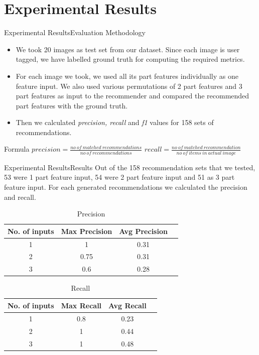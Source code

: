 \documentclass[10pt]{beamer}
\begin{document}
\section{Experimental Results}
\begin{frame}{Experimental Results}{Evaluation Methodology}
\begin{itemize}
\item We took 20 images as test set from our dataset. Since each image is user tagged, we have labelled ground truth for computing the required metrics.
\pause
\item For each image we took, we used all its part features individually as one feature input. We also used various permutations of 2 part features and 3 part features as input to the recommender and compared the recommended part features with the ground truth.
\pause
\item Then we calculated \textit{precision, recall} and \textit{f1} values for 158 sets of recommendations.
\end{itemize}
\pause
\begin{block}{Formula}
$precision = \frac{no \ of \ matched \ recommendations}{no \ of \ recommendations}$
\newline
$recall = \frac{no \ of \ matched \ recommendation}{no \ of \ items \ in \ actual \ image}$
\end{block}
\end{frame}

\begin{frame}{Experimental Results}{Results}
Out of the 158 recommendation sets that we tested, 53 were 1 part feature input, 54 were 2 part feature input and 51 as 3 part feature input. For each generated recommendations we calculated the precision and recall.

\begin{table}
\centering
\caption{Precision}
\begin{tabular}{|c|c|c|c|}
\hline
No. of inputs & Max Precision & Avg Precision\\
\hline\hline
1 & 1 & 0.31\\
2 & 0.75 & 0.31\\
3 & 0.6 & 0.28\\
\hline\end{tabular}
\label{table:precision}
\end{table}

\begin{table}
\centering
\caption{Recall}
\begin{tabular}{|c|c|c|c|}
\hline
No. of inputs & Max Recall & Avg Recall\\
\hline\hline
1 & 0.8 & 0.23\\
2 & 1 & 0.44\\
3 & 1 & 0.48\\
\hline\end{tabular}
\label{table:recall}
\end{table}
\end{frame}
\end{document}
